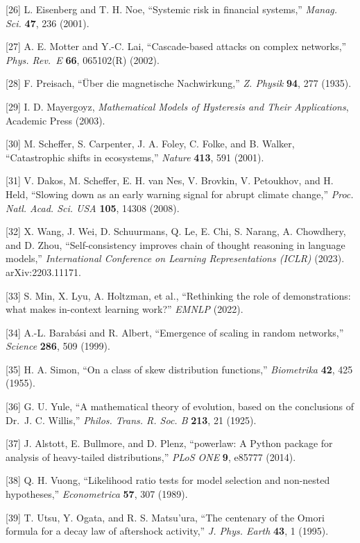\documentclass[
  letterpaper,
  11pt]{article}
\begin{document}
{[}26{]} L. Eisenberg and T. H. Noe, ``Systemic risk in financial
systems,'' \emph{Manag. Sci.} \textbf{47}, 236 (2001).

{[}27{]} A. E. Motter and Y.-C. Lai, ``Cascade-based attacks on complex
networks,'' \emph{Phys. Rev.~E} \textbf{66}, 065102(R) (2002).

{[}28{]} F. Preisach, ``Über die magnetische Nachwirkung,'' \emph{Z.
Physik} \textbf{94}, 277 (1935).

{[}29{]} I. D. Mayergoyz, \emph{Mathematical Models of Hysteresis and
Their Applications}, Academic Press (2003).

{[}30{]} M. Scheffer, S. Carpenter, J. A. Foley, C. Folke, and B.
Walker, ``Catastrophic shifts in ecosystems,'' \emph{Nature}
\textbf{413}, 591 (2001).

{[}31{]} V. Dakos, M. Scheffer, E. H. van Nes, V. Brovkin, V. Petoukhov,
and H. Held, ``Slowing down as an early warning signal for abrupt
climate change,'' \emph{Proc. Natl. Acad. Sci. USA} \textbf{105}, 14308
(2008).

{[}32{]} X. Wang, J. Wei, D. Schuurmans, Q. Le, E. Chi, S. Narang, A.
Chowdhery, and D. Zhou, ``Self-consistency improves chain of thought
reasoning in language models,'' \emph{International Conference on
Learning Representations (ICLR)} (2023). arXiv:2203.11171.

{[}33{]} S. Min, X. Lyu, A. Holtzman, et al., ``Rethinking the role of
demonstrations: what makes in-context learning work?'' \emph{EMNLP}
(2022).

{[}34{]} A.-L. Barabási and R. Albert, ``Emergence of scaling in random
networks,'' \emph{Science} \textbf{286}, 509 (1999).

{[}35{]} H. A. Simon, ``On a class of skew distribution functions,''
\emph{Biometrika} \textbf{42}, 425 (1955).

{[}36{]} G. U. Yule, ``A mathematical theory of evolution, based on the
conclusions of Dr.~J. C. Willis,'' \emph{Philos. Trans. R. Soc. B}
\textbf{213}, 21 (1925).

{[}37{]} J. Alstott, E. Bullmore, and D. Plenz, ``powerlaw: A Python
package for analysis of heavy-tailed distributions,'' \emph{PLoS ONE}
\textbf{9}, e85777 (2014).

{[}38{]} Q. H. Vuong, ``Likelihood ratio tests for model selection and
non-nested hypotheses,'' \emph{Econometrica} \textbf{57}, 307 (1989).

{[}39{]} T. Utsu, Y. Ogata, and R. S. Matsu'ura, ``The centenary of the
Omori formula for a decay law of aftershock activity,'' \emph{J. Phys.
Earth} \textbf{43}, 1 (1995).
\end{document}
